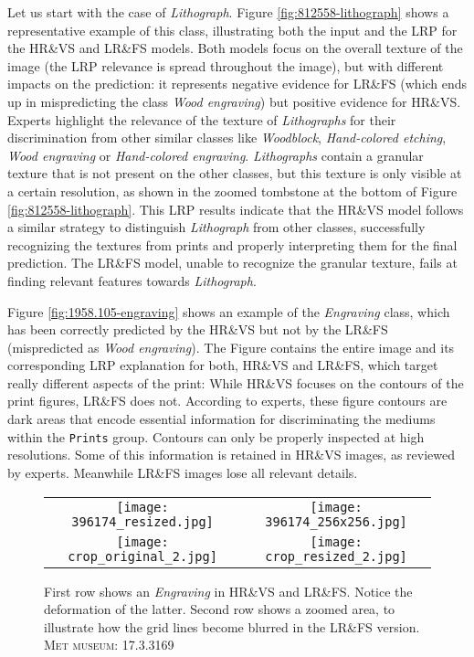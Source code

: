 \documentclass{article}
\begin{document}
Let us start with the case of \textit{Lithograph}. Figure \ref{fig:812558-lithograph} shows a representative example of this class, illustrating both the input and the LRP for the HR\&VS and LR\&FS models. Both models focus on the overall texture of the image (the LRP relevance is spread throughout the image), but with different impacts on the prediction: it represents negative evidence for LR\&FS (which ends up in mispredicting the class \textit{Wood engraving}) but positive evidence for HR\&VS. Experts highlight the relevance of the texture of \textit{Lithographs} for their discrimination from other similar classes like \textit{Woodblock}, \textit{Hand-colored etching}, \textit{Wood engraving} or \textit{Hand-colored engraving}. \textit{Lithographs} contain a granular texture that is not present on the other classes, but this texture is only visible at a certain resolution, as shown in the zoomed tombstone at the bottom of Figure \ref{fig:812558-lithograph}. This LRP results indicate that the HR\&VS model follows a similar strategy to distinguish \textit{Lithograph} from other classes, successfully recognizing the textures from prints and properly interpreting them for the final prediction. The LR\&FS model, unable to recognize the granular texture, fails at finding relevant features towards \textit{Lithograph}.

Figure \ref{fig:1958.105-engraving} shows an example of the \textit{Engraving} class, which has been correctly predicted by the HR\&VS but not by the LR\&FS (mispredicted as \textit{Wood engraving}). The Figure contains the entire image and its corresponding LRP explanation for both, HR\&VS and LR\&FS, which target really different aspects of the print: While HR\&VS focuses on the contours of the print figures, LR\&FS does not. According to experts, these figure contours are dark areas that encode essential information for discriminating the mediums within the \texttt{Prints} group. Contours can only be properly inspected at high resolutions. Some of this information is retained in HR\&VS images, as reviewed by experts. Meanwhile LR\&FS images lose all relevant details. 

\begin{figure}[tb]
    \centering
    \begin{tabular}{cc}
        \texttt{[image: 396174\_resized.jpg]} &
        \texttt{[image: 396174\_256x256.jpg]}\\
        \texttt{[image: crop\_original\_2.jpg]} &
        \texttt{[image: crop\_resized\_2.jpg]}\\
\end{tabular}   
    \caption{First row shows an \textit{Engraving} in HR\&VS and LR\&FS. Notice the deformation of the latter. Second row shows a zoomed area, to illustrate how the grid lines become blurred in the LR\&FS version.\\
    \small{\textsc{Met museum: 17.3.3169}}}
    \label{fig:396174-engraving}
\end{figure}
\end{document}
